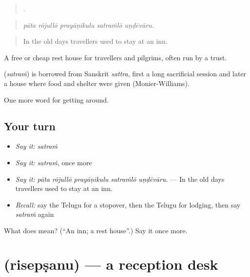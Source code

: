 \begin{quote}
    .
\end{quote}

\begin{quote}
\emph{pāta rōjullō prayāṇikulu satraṁlō uṇḍēvāru.}
\end{quote}

\begin{quote}
In the old days travellers used to stay at an inn.
\end{quote}

A free or cheap rest house for travellers and pilgrims, often run by a trust.

\begin{cousinweb}
\textbf{} (\emph{satraṁ}) is borrowed from Sanskrit \emph{sattra}, first a long sacrificial session and later a house where food and shelter were given (Monier-Williams).
\end{cousinweb}

\begin{grammarlens}[title={What you've built}]
One more word for getting around.
\end{grammarlens}

\subsection*{Your turn}
\begin{itemize}
\raggedright
  \item \emph{Say it:} \emph{satraṁ}
  \item \emph{Say it:} \emph{satraṁ}, once more
  \item \emph{Say it:} \emph{pāta rōjullō prayāṇikulu satraṁlō uṇḍēvāru.} — In the old days travellers used to stay at an inn.
  \item \emph{Recall:} say the Telugu for a stopover, then the Telugu for lodging, then say \emph{satraṁ} again
\end{itemize}

\begin{tcolorbox}[breakable,colback=teal!4,colframe=teal!35!black,title={Before you move on}]
What does  mean? (\textquotedblleft{}An inn; a rest house\textquotedblright{}.) Say it once more.
\end{tcolorbox}
\section[\texorpdfstring{\te{రిసెప్షను} (risepṣanu)}{రిసెప్షను (risepṣanu)}]{ (risepṣanu) — a reception desk}


